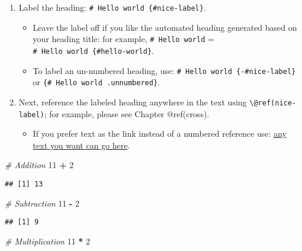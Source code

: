 \documentclass[
]{book}
\newenvironment{Shaded}{\begin{snugshade}}{\end{snugshade}}
\newcommand{\CommentTok}[1]{\textcolor[rgb]{0.56,0.35,0.01}{\textit{#1}}}
\newcommand{\DecValTok}[1]{\textcolor[rgb]{0.00,0.00,0.81}{#1}}
\newcommand{\SpecialCharTok}[1]{\textcolor[rgb]{0.81,0.36,0.00}{\textbf{#1}}}
\providecommand{\tightlist}{%
  \setlength{\itemsep}{0pt}\setlength{\parskip}{0pt}}
\begin{document}
\begin{enumerate}
\def\labelenumi{\arabic{enumi}.}
\tightlist
\item
  Label the heading: \texttt{\#\ Hello\ world\ \{\#nice-label\}}.

  \begin{itemize}
  \tightlist
  \item
    Leave the label off if you like the automated heading generated
    based on your heading title: for example, \texttt{\#\ Hello\ world}
    = \texttt{\#\ Hello\ world\ \{\#hello-world\}}.
  \item
    To label an un-numbered heading, use:
    \texttt{\#\ Hello\ world\ \{-\#nice-label\}} or
    \texttt{\{\#\ Hello\ world\ .unnumbered\}}.
  \end{itemize}
\item
  Next, reference the labeled heading anywhere in the text using
  \texttt{\textbackslash{}@ref(nice-label)}; for example, please see
  Chapter @ref(cross).

  \begin{itemize}
  \tightlist
  \item
    If you prefer text as the link instead of a numbered reference use:
    \protect\hyperlink{cross}{any text you want can go here}.
  \end{itemize}
\end{enumerate}

\begin{Shaded}
\begin{Highlighting}[]
\CommentTok{\# Addition}
\DecValTok{11} \SpecialCharTok{+} \DecValTok{2}
\end{Highlighting}
\end{Shaded}

\begin{verbatim}
## [1] 13
\end{verbatim}

\begin{Shaded}
\begin{Highlighting}[]
\CommentTok{\# Subtraction}
\DecValTok{11} \SpecialCharTok{{-}} \DecValTok{2}  
\end{Highlighting}
\end{Shaded}

\begin{verbatim}
## [1] 9
\end{verbatim}

\begin{Shaded}
\begin{Highlighting}[]
\CommentTok{\# Multiplication}
\DecValTok{11} \SpecialCharTok{*} \DecValTok{2}
\end{Highlighting}
\end{Shaded}
\end{document}
